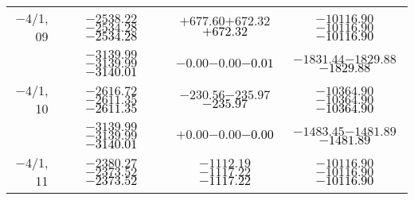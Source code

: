 \documentclass[compress]{beamer}
\begin{document}
\begin{frame}
{\begin{tabular}{r | c | c | c}
$-$4/1, 09 & $-2538.22$\hspace{0.1 cm}$-2534.28$\hspace{0.1 cm}\textcolor{black}{$-2534.28$} & $+677.60$\hspace{0.1 cm}$+672.32$\hspace{0.1 cm}\textcolor{black}{$+672.32$} & $-10116.90$\hspace{0.1 cm}$-10116.90$\hspace{0.1 cm}\textcolor{black}{$-10116.90$} \\
           & $-3139.99$\hspace{0.1 cm}$-3139.99$\hspace{0.1 cm}\textcolor{black}{$-3140.01$} & $-0.00$\hspace{0.1 cm}$-0.00$\hspace{0.1 cm}\textcolor{black}{$-0.01$} & $-1831.44$\hspace{0.1 cm}$-1829.88$\hspace{0.1 cm}\textcolor{black}{$-1829.88$} \\
$-$4/1, 10 & $-2616.72$\hspace{0.1 cm}$-2611.35$\hspace{0.1 cm}\textcolor{black}{$-2611.35$} & $-230.56$\hspace{0.1 cm}$-235.97$\hspace{0.1 cm}\textcolor{black}{$-235.97$} & $-10364.90$\hspace{0.1 cm}$-10364.90$\hspace{0.1 cm}\textcolor{black}{$-10364.90$} \\
           & $-3139.99$\hspace{0.1 cm}$-3139.99$\hspace{0.1 cm}\textcolor{black}{$-3140.01$} & $+0.00$\hspace{0.1 cm}$-0.00$\hspace{0.1 cm}\textcolor{black}{$-0.00$} & $-1483.45$\hspace{0.1 cm}$-1481.89$\hspace{0.1 cm}\textcolor{black}{$-1481.89$} \\
$-$4/1, 11 & $-2380.27$\hspace{0.1 cm}$-2373.52$\hspace{0.1 cm}\textcolor{black}{$-2373.52$} & $-1112.19$\hspace{0.1 cm}$-1117.22$\hspace{0.1 cm}\textcolor{black}{$-1117.22$} & $-10116.90$\hspace{0.1 cm}$-10116.90$\hspace{0.1 cm}\textcolor{black}{$-10116.90$} \\

\end{tabular}}
\end{frame}
\end{document}
